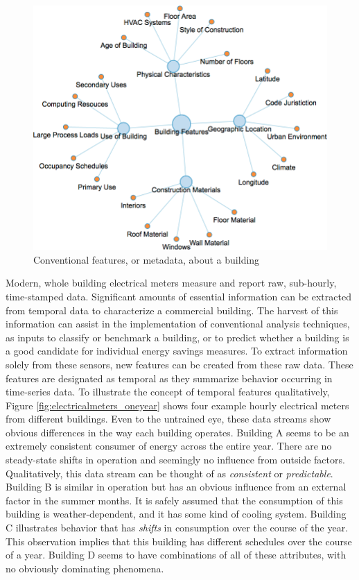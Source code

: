 \begin{figure}[ht!]
\begin{center}
\includegraphics[width=0.7\columnwidth]{figures/TypicalFeatures/nontemporalforcechart}
\caption{Conventional features, or metadata, about a building
\label{fig:convfeatures}%
}
\end{center}
\end{figure}

Modern, whole building electrical meters measure and report raw, sub-hourly, time-stamped data. Significant amounts of essential information can be extracted from temporal data to characterize a commercial building. The harvest of this information can assist in the implementation of conventional analysis techniques, as inputs to classify or benchmark a building, or to predict whether a building is a good candidate for individual energy savings measures. To extract information solely from these sensors, new features can be created from these raw data. These features are designated as temporal as they summarize behavior occurring in time-series data. To illustrate the concept of temporal features qualitatively, Figure \ref{fig:electricalmeters_oneyear} shows four example hourly electrical meters from different buildings. Even to the untrained eye, these data streams show obvious differences in the way each building operates. Building A seems to be an extremely consistent consumer of energy across the entire year. There are no steady-state shifts in operation and seemingly no influence from outside factors. Qualitatively, this data stream can be thought of as \emph{consistent} or \emph{predictable}. Building B is similar in operation but has an obvious influence from an external factor in the summer months. It is safely assumed that the consumption of this building is weather-dependent, and it has some kind of cooling system. Building C illustrates behavior that has \emph{shifts} in consumption over the course of the year. This observation implies that this building has different schedules over the course of a year. Building D seems to have combinations of all of these attributes, with no obviously dominating phenomena. 


